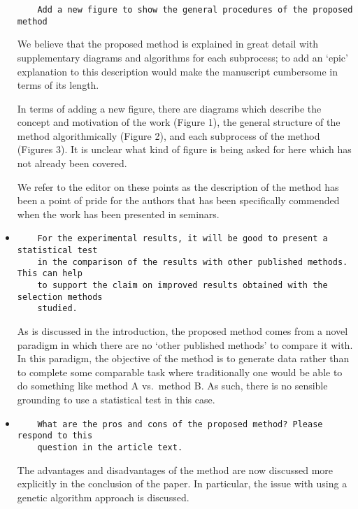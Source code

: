 \documentclass[11pt]{article}
\begin{document}
\begin{itemize}
\begin{verbatim}
    Add a new figure to show the general procedures of the proposed method
\end{verbatim}

We believe that the proposed method is explained in great detail with
supplementary diagrams and algorithms for each subprocess; to add an `epic'
explanation to this description would make the manuscript cumbersome in terms of
its length.

In terms of adding a new figure, there are diagrams which describe the concept
and motivation of the work (Figure 1), the general structure of the method
algorithmically (Figure 2), and each subprocess of the method (Figures 3).
It is unclear what kind of figure is being asked for here which has not already
been covered.

We refer to the editor on these points as the description of the method has been
a point of pride for the authors that has been specifically commended when the
work has been presented in seminars.


\item
\begin{verbatim}
    For the experimental results, it will be good to present a statistical test
    in the comparison of the results with other published methods. This can help
    to support the claim on improved results obtained with the selection methods
    studied.
\end{verbatim}

As is discussed in the introduction, the proposed method comes from a novel
paradigm in which there are no `other published methods' to compare it with. In
this paradigm, the objective of the method is to generate data rather than to
complete some comparable task where traditionally one would be able to do
something like method A vs.\ method B. As such, there is no sensible grounding
to use a statistical test in this case.

\item
\begin{verbatim}
    What are the pros and cons of the proposed method? Please respond to this
    question in the article text.
\end{verbatim}

The advantages and disadvantages of the method are now discussed more explicitly
in the conclusion of the paper. In particular, the issue with using a genetic
algorithm approach is discussed.



\end{itemize}
\end{document}

